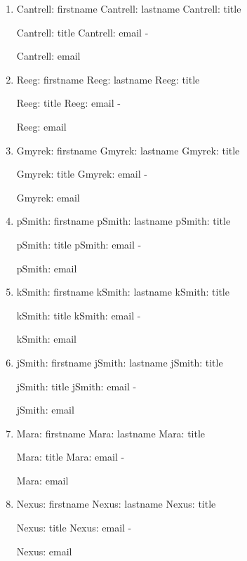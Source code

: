\documentclass[11pt]{article}
\newcommand{\printcontributor}[1]{%
  \begingroup
  \parindent 0pt
  \usevalue #1: firstname
  \space
  \usevalue #1: lastname
  \ifattribute #1: title {\par}{\relax}
  \usevalue #1: title
  \ifattribute #1: email {\space-\space} {\par\relax}
  \usevalue #1: email
  \endgroup
}
\begin{document}
\begingroup
\parindent 0pt
\parskip  8pt

\begin{enumerate}
\item 
\printcontributor{Cantrell}

\item
\printcontributor{Reeg}

\item
\printcontributor{Gmyrek}

\item
\printcontributor{pSmith}

\item
\printcontributor{kSmith}

\item
\printcontributor{jSmith}

\item
\printcontributor{Mara}

\item
\printcontributor{Nexus}
\end{enumerate}

\endgroup
\end{document}

